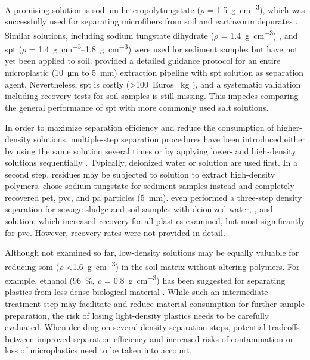 A promising solution is sodium heteropolytungstate ($\rho$
= \SI{1.5}{\gram\per\cubic\centi\meter}), which was successfully used for separating microfibers from soil and earthworm depurates \citep{Prendergast-MillerPolyesterderived2019}. Similar solutions, including sodium tungstate dihydrate ($\rho$ = \SI{1.4}{\gram\per\cubic\centi\meter}) \citep{FriasStandardised2018}, and \ac{spt}
($\rho$ = \SIrange{1.4}{1.8}{\gram\per\cubic\centi\meter}) \citep{BallentSources2016,EndersTracing2019,EndersWhen2020,CorcoranPlastics2009} were used for sediment samples but have not yet been applied to soil.
\citet{EndersWhen2020} provided a detailed guidance protocol for an entire microplastic (\SI{10}{\micro\meter} to \SI{5}{\milli\meter}) extraction pipeline with \ac{spt}
solution as separation agent. Nevertheless, \ac{spt} is costly (\num{>100}~Euros \si{\per\kilo\gram} \citep{CampanalePractical2020}), and a systematic validation including recovery tests for soil samples is still missing. This impedes comparing the general performance of \ac{spt}
with more commonly used salt solutions.

In order to maximize separation efficiency and reduce the consumption of higher-density solutions, multiple-step separation procedures have been introduced either by using the same solution several times \citep{LiuMicroplastic2018,HuangAgricultural2020} or by applying lower- and high-density solutions sequentially \citep{NuelleNew2014,HurleyValidation2018,CorradiniEvidence2019,vandenBergSewage2020,DekiffOccurrence2014,ZhouDistribution2018}. Typically, deionized water \citep{vandenBergSewage2020,HurleyValidation2018} or  solution \citep{NuelleNew2014,DekiffOccurrence2014,ZhouDistribution2018,FrereInfluence2017} are used first. In a second step, residues may be subjected to  solution to extract high-density polymers. \citet{FrereInfluence2017} chose sodium tungstate for sediment samples instead and completely recovered \ac{pet},
\ac{pvc}, and \ac{pa} particles (\SI{5}{\milli\meter}). \citet{CorradiniEvidence2019} even performed a three-step density separation for sewage sludge and soil samples with deionized water, , and  solution, which increased recovery for all plastics examined, but most significantly for
\ac{pvc}. However, recovery rates were not provided in detail.

Although not examined so far, low-density solutions may be equally valuable for reducing \ac{som} ($\rho$ \SI{<1.6}{\gram\per\cubic\centi\meter}) \citep{CerliSeparation2012} in the soil matrix without altering polymers. For example, ethanol (\SI{96}{\percent}, $\rho$ = \SI{0.8}{\gram\per\cubic\centi\meter}) has been suggested for separating plastics from less dense biological material \citep{HerreraNovel2018}. While such an intermediate treatment step may facilitate and reduce material consumption for further sample preparation, the risk of losing light-density plastics needs to be carefully evaluated. When deciding on several density separation steps, potential tradeoffs between improved separation efficiency and increased risks of contamination or loss of microplastics need to be taken into account.

